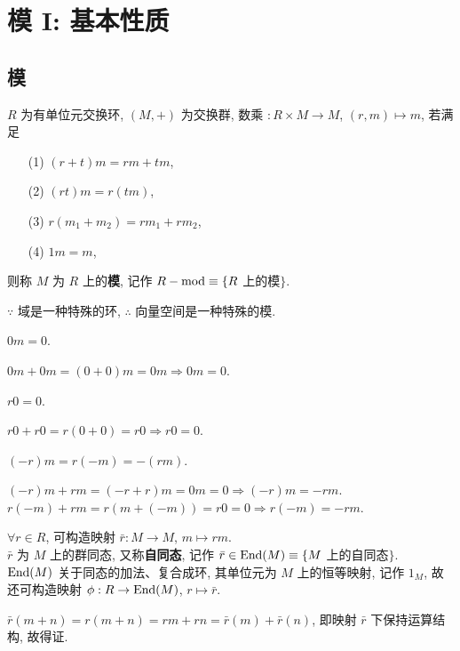 \documentclass{note}
\begin{document}
\fi
\chapter{模 I: 基本性质}
\section{模}
\begin{df}[模]
    $R$ 为有单位元交换环, $(M,+)$ 为交换群, 数乘 $:R\times M\rightarrow M$, $(r,m)\mapsto m$, 若满足
    \begin{itemize}
        \item[(1)] $(r+t)m=rm+tm$,
        \item[(2)] $(rt)m=r(tm)$,
        \item[(3)] $r(m_1+m_2)=rm_1+rm_2$,
        \item[(4)] $1m=m$,
    \end{itemize}
    则称 $M$ 为 $R$ 上的\textbf{模}, 记作 $R-\operatorname{mod}\equiv\{R$ 上的模$\}$.
\end{df}

$\because$ 域是一种特殊的环, $\therefore$ 向量空间是一种特殊的模.

$0m=0$.
\begin{pf}
    $0m+0m=(0+0)m=0m\Longrightarrow 0m=0$.
\end{pf}

$r0=0$.
\begin{pf}
    $r0+r0=r(0+0)=r0\Longrightarrow r0=0$.
\end{pf}

$(-r)m=r(-m)=-(rm)$.
\begin{pf}
    $(-r)m+rm=(-r+r)m=0m=0\Longrightarrow(-r)m=-rm$.\\
    $r(-m)+rm=r(m+(-m))=r0=0\Longrightarrow r(-m)=-rm$.
\end{pf}

$\forall r\in R$, 可构造映射 $\bar{r}:M\rightarrow M$, $m\mapsto rm$.\\
$\bar{r}$ 为 $M$ 上的群同态, 又称\textbf{自同态}, 记作 $\bar{r}\in\operatorname{End}(M)\equiv\{M$ 上的自同态$\}$.\\
$\operatorname{End}(M)$ 关于同态的加法、复合成环, 其单位元为 $M$ 上的恒等映射, 记作 $1_M$, 故还可构造映射 $\phi:R\rightarrow\operatorname{End}(M)$, $r\mapsto\bar{r}$.
\begin{pf}
    $\bar{r}(m+n)=r(m+n)=rm+rn=\bar{r}(m)+\bar{r}(n)$, 即映射 $\bar{r}$ 下保持运算结构, 故得证.
\end{pf}
\end{document}
